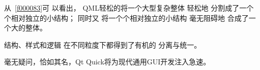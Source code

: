 从\filesourcenumbernameone\ \ref{f000083}可
以看出，
QML轻松的将一个大型复杂整体
轻松地
分割成了一个个相对独立的小结构；
同时又
将一个个相对独立的小结构
毫无阻碍地
合成了一个大的整体。

结构、样式和逻辑
在不同粒度下都得到了有机的
分离与统一。



毫无疑问，恰如其名，Qt Quick将为现代通用GUI开发注入急速。












